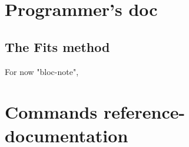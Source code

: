 \part{Programmer's doc}






















\COM
{
\chapter{The Fits method}

For now "bloc-note",

}


\part{Commands reference-documentation}







